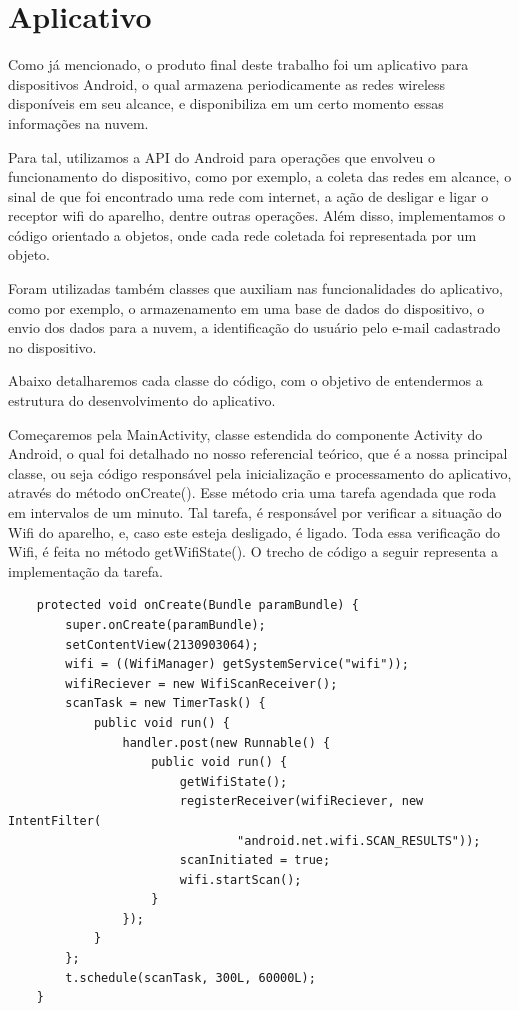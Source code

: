 \documentclass[12pt, %
openright, 
oneside,
a4paper,
brazil]{facom-ufu-abntex2}
\begin{document}
\section{Aplicativo}
Como já mencionado, o produto final deste trabalho foi um aplicativo para dispositivos Android, o qual armazena periodicamente as redes wireless disponíveis em seu alcance, e disponibiliza em um certo momento essas informações na nuvem.

Para tal, utilizamos a API do Android para operações que envolveu o funcionamento do dispositivo, como por exemplo, a coleta das redes em alcance, o sinal de que foi encontrado uma rede com internet, a ação de desligar e ligar o receptor wifi do aparelho, dentre outras operações. Além disso, implementamos o código orientado a objetos, onde cada rede coletada foi representada por um objeto.

Foram utilizadas também classes que auxiliam nas funcionalidades do aplicativo, como por exemplo, o armazenamento em uma base de dados do dispositivo, o envio dos dados para a nuvem, a identificação do usuário pelo e-mail cadastrado no dispositivo.

Abaixo detalharemos cada classe do código, com o objetivo de entendermos a estrutura do desenvolvimento do aplicativo.

Começaremos pela MainActivity, classe estendida do componente Activity do Android, o qual foi detalhado no nosso referencial teórico, que é a nossa principal classe, ou seja código responsável pela inicialização e processamento do aplicativo, através do método onCreate(). Esse método cria uma tarefa agendada que roda em intervalos de um minuto. Tal tarefa, é responsável por verificar a situação do Wifi do aparelho, e, caso este esteja desligado, é ligado. Toda essa verificação do Wifi, é feita no método getWifiState(). O trecho de código a seguir representa a implementação da tarefa.
\begin{lstlisting}
	protected void onCreate(Bundle paramBundle) {
		super.onCreate(paramBundle);
		setContentView(2130903064);
		wifi = ((WifiManager) getSystemService("wifi"));
		wifiReciever = new WifiScanReceiver();
		scanTask = new TimerTask() {
			public void run() {
				handler.post(new Runnable() {
					public void run() {
						getWifiState();
						registerReceiver(wifiReciever, new IntentFilter(
								"android.net.wifi.SCAN_RESULTS"));
						scanInitiated = true;
						wifi.startScan();
					}
				});
			}
		};
		t.schedule(scanTask, 300L, 60000L);
	}
\end{lstlisting}
\end{document}
